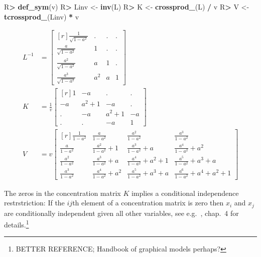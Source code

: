 \documentclass[10pt,]{article}
\newenvironment{Shaded}{\begin{snugshade}}{\end{snugshade}}
\newcommand{\KeywordTok}[1]{\textcolor[rgb]{0.13,0.29,0.53}{\textbf{#1}}}
\newcommand{\NormalTok}[1]{#1}
\newcommand{\OperatorTok}[1]{\textcolor[rgb]{0.81,0.36,0.00}{\textbf{#1}}}
\newcommand{\StringTok}[1]{\textcolor[rgb]{0.31,0.60,0.02}{#1}}
\begin{document}
\begin{Shaded}
\begin{Highlighting}[]
\NormalTok{R}\OperatorTok{>}\StringTok{ }\KeywordTok{def_sym}\NormalTok{(v)}
\NormalTok{R}\OperatorTok{>}\StringTok{ }\NormalTok{Linv <-}\StringTok{ }\KeywordTok{inv}\NormalTok{(L)}
\NormalTok{R}\OperatorTok{>}\StringTok{ }\NormalTok{K <-}\StringTok{ }\KeywordTok{crossprod_}\NormalTok{(L) }\OperatorTok{/}\StringTok{ }\NormalTok{v}
\NormalTok{R}\OperatorTok{>}\StringTok{ }\NormalTok{V <-}\StringTok{ }\KeywordTok{tcrossprod_}\NormalTok{(Linv) }\OperatorTok{*}\StringTok{ }\NormalTok{v}
\end{Highlighting}
\end{Shaded}

\begin{align} 
    L^{-1}&= \left[\begin{matrix}[r]\frac{1}{\sqrt{1 - a^{2}}} & . & . & .\\\frac{a}{\sqrt{1 - a^{2}}} & 1 & . & .\\\frac{a^{2}}{\sqrt{1 - a^{2}}} & a & 1 & .\\\frac{a^{3}}{\sqrt{1 - a^{2}}} & a^{2} & a & 1\end{matrix}\right] \\ 
    K &= \frac{1}{v}  \left[\begin{matrix}[r]1 & - a & . & .\\- a & a^{2} + 1 & - a & .\\. & - a & a^{2} + 1 & - a\\. & . & - a & 1\end{matrix}\right] \\ 
    V &= v  \left[\begin{matrix}[r]\frac{1}{1 - a^{2}} & \frac{a}{1 - a^{2}} & \frac{a^{2}}{1 - a^{2}} & \frac{a^{3}}{1 - a^{2}}\\\frac{a}{1 - a^{2}} & \frac{a^{2}}{1 - a^{2}} + 1 & \frac{a^{3}}{1 - a^{2}} + a & \frac{a^{4}}{1 - a^{2}} + a^{2}\\\frac{a^{2}}{1 - a^{2}} & \frac{a^{3}}{1 - a^{2}} + a & \frac{a^{4}}{1 - a^{2}} + a^{2} + 1 & \frac{a^{5}}{1 - a^{2}} + a^{3} + a\\\frac{a^{3}}{1 - a^{2}} & \frac{a^{4}}{1 - a^{2}} + a^{2} & \frac{a^{5}}{1 - a^{2}} + a^{3} + a & \frac{a^{6}}{1 - a^{2}} + a^{4} + a^{2} + 1\end{matrix}\right] 
  \end{align}

The zeros in the concentration matrix \(K\) implies a conditional
independence restrstriction: If the \(ij\)th element of a concentration
matrix is zero then \(x_i\) and \(x_j\) are conditionally independent
given all other variables, see e.g.~\citep{hojsgaard:etal:12}, chap.~4
for details.\footnote{BETTER REFERENCE; Handbook of graphical models
perhaps?}
\end{document}
